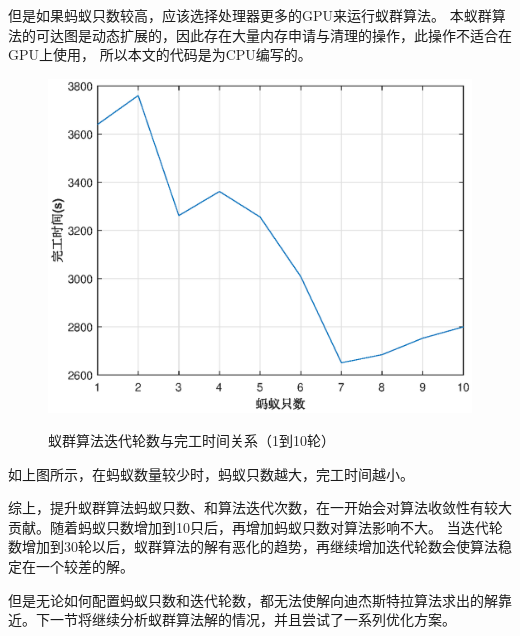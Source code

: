 但是如果蚂蚁只数较高，应该选择处理器更多的GPU来运行蚁群算法。
本蚁群算法的可达图是动态扩展的，因此存在大量内存申请与清理的操作，此操作不适合在GPU上使用，
所以本文的代码是为CPU编写的。

\begin{table}[H]
	\centering
	\caption{蚁群算法蚂蚁只数与完工时间的关系（小只数）}
\end{table}

\begin{figure}[H]
	\centering
	\includegraphics[scale=1.00,angle=0]{figures/count_t_small.eps}\\
	\caption{蚁群算法迭代轮数与完工时间关系（1到10轮）}
\end{figure}

如上图所示，在蚂蚁数量较少时，蚂蚁只数越大，完工时间越小。

综上，提升蚁群算法蚂蚁只数、和算法迭代次数，在一开始会对算法收敛性有较大贡献。随着蚂蚁只数增加到10只后，再增加蚂蚁只数对算法影响不大。
当迭代轮数增加到30轮以后，蚁群算法的解有恶化的趋势，再继续增加迭代轮数会使算法稳定在一个较差的解。

但是无论如何配置蚂蚁只数和迭代轮数，都无法使解向迪杰斯特拉算法求出的解靠近。下一节将继续分析蚁群算法解的情况，并且尝试了一系列优化方案。
